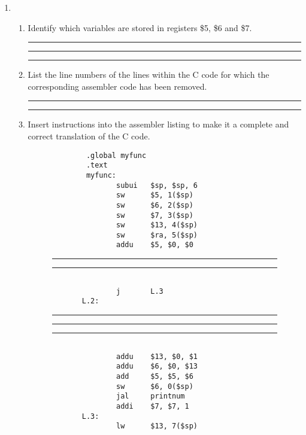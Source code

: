 \documentclass[a4paper,10pt]{article}
\begin{document}
\begin{enumerate}
\item \begin{enumerate}
\item Identify which variables are stored in registers \$5, \$6 and \$7.
\vspace{7mm}\hrule\vspace{7mm}\hrule\vspace{7mm}\hrule\vspace{3mm}
\item List the line numbers of the lines within the C code for which the corresponding assembler code has been removed.
\vspace{7mm}\vspace{3mm}\hrule\vspace{7mm}\hrule\vspace{3mm}

\item Insert instructions into the assembler listing to make it a complete and correct translation of the C code.

\begin{figure}[ht]
{\small
\begin{verbatim}
        .global myfunc
        .text
        myfunc:
               subui   $sp, $sp, 6
               sw      $5, 1($sp)
               sw      $6, 2($sp)
               sw      $7, 3($sp)
               sw      $13, 4($sp)
               sw      $ra, 5($sp)
               addu    $5, $0, $0

\end{verbatim}   
\vspace{7mm}\hrule\vspace{7mm}\hrule

\begin{verbatim}

               j       L.3
       L.2:

\end{verbatim}   
\vspace{7mm}\hrule\vspace{7mm}\hrule\vspace{7mm}\hrule

\begin{verbatim}

               addu    $13, $0, $1
               addu    $6, $0, $13
               add     $5, $5, $6
               sw      $6, 0($sp)
               jal     printnum
               addi    $7, $7, 1
       L.3:
               lw      $13, 7($sp)


\end{verbatim}}
\end{figure}
\end{enumerate}
\end{enumerate}
\end{document}
